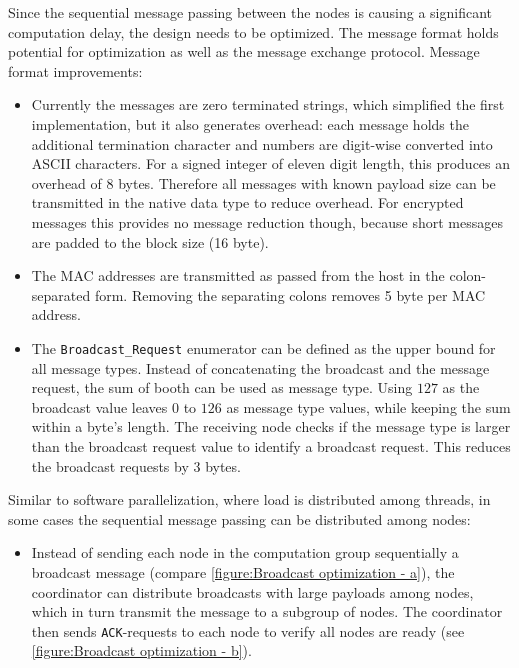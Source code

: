 Since the sequential message passing between the nodes is causing a significant computation delay, the design needs to be optimized. The message format holds potential for optimization as well as the message exchange protocol.
Message format improvements:
\begin{itemize}
	\item Currently the messages are zero terminated strings, which simplified the first implementation, but it also generates overhead: each message holds the additional termination character and numbers are digit-wise converted into ASCII characters. For a signed integer of eleven digit length, this produces an overhead of 8 bytes. Therefore all messages with known payload size can be transmitted in the native data type to reduce overhead. For encrypted messages this provides no message reduction though, because short messages are padded to the block size (16 byte).
	\item The \gls{MAC} addresses are transmitted as passed from the host in the colon-separated form. Removing the separating colons removes 5 byte per \gls{MAC} address.
	\item The \lstinline|Broadcast_Request| enumerator can be defined as the upper bound for all message types.  Instead of concatenating the broadcast and the message request, the sum of booth can be used as message type. Using $127$ as the broadcast value leaves $0$ to $126$ as message type values, while keeping the sum within a byte's length. The receiving node checks if the message type is larger than the broadcast request value to identify a broadcast request. This reduces the broadcast requests by 3 bytes.
\end{itemize}

Similar to software parallelization, where load is distributed among threads, in some cases the sequential message passing can be distributed among nodes:
\begin{itemize}
	\item Instead of sending each node in the computation group sequentially a broadcast message (compare \autoref{figure:Broadcast optimization - a}), the coordinator can distribute broadcasts with large payloads among nodes, which in turn transmit the message to a subgroup of nodes. The coordinator then sends \lstinline|ACK|-requests to each node to verify all nodes are ready (see \autoref{figure:Broadcast optimization - b}).
\end{itemize}

